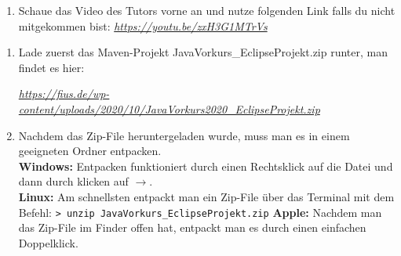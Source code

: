 

\newcommand{\jvkpackage}{JavaVorkurs\_EclipseProjekt.zip}
\newcommand{\jvkpackageurl}{https://fius.de/wp-content/uploads/2020/10/JavaVorkurs2020\_EclipseProjekt.zip} %


\begin{Infobox}
    \begin{enumerate}[label=\arabic*.]
        \item Schaue das Video des Tutors vorne an und nutze folgenden Link falls du nicht mitgekommen bist:
        \color{blue}\href{https://youtu.be/zxH3G1MTrVs}{\textit{https://youtu.be/zxH3G1MTrVs}}
    \end{enumerate}
\end{Infobox}

\begin{Infobox}
    \begin{enumerate}[label=\arabic*.]
        \item Lade zuerst das Maven-Projekt \jvkpackage { }runter, man findet es hier:
        \begin{center}
            \color{blue}\href{\jvkpackageurl}{\textit{\jvkpackageurl}}
        \end{center}

        \item Nachdem das Zip-File heruntergeladen wurde, muss man es in einem geeigneten Ordner entpacken.\\
        \textbf{Windows:} Entpacken funktioniert durch einen Rechtsklick auf die Datei und dann durch klicken auf $\to$.\\
        \textbf{Linux:} Am schnellsten entpackt man ein Zip-File über das Terminal mit dem Befehl:
        \newline\hspace*{\fill}\texttt{\textgreater\ unzip \jvkpackage}\hspace*{\fill}\newline
        \textbf{Apple:} Nachdem man das Zip-File im Finder offen hat, entpackt man es durch einen einfachen Doppelklick.
    \end{enumerate}
\end{Infobox}



